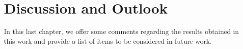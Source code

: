 \chapter{Discussion and Outlook\label{ChOut}}
In this last chapter, we offer some comments regarding the results obtained in this work and provide a list of items to be considered in future work.


